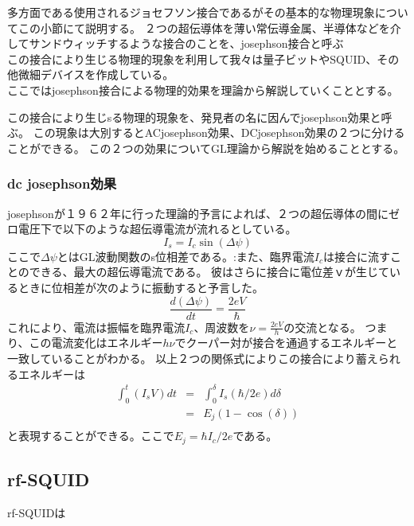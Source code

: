             多方面である使用されるジョセフソン接合であるがその基本的な物理現象についてこの小節にて説明する。
            ２つの超伝導体を薄い常伝導金属、半導体などを介してサンドウィッチするような接合のことを、josephson接合と呼ぶ\\
            この接合により生じる物理的現象を利用して我々は量子ビットやSQUID、その他微細デバイスを作成している。\\
            ここではjosephson接合による物理的効果を理論から解説していくこととする。

    
            この接合により生じsる物理的現象を、発見者の名に因んでjosephson効果と呼ぶ。
            この現象は大別するとACjosephson効果、DCjosephson効果の２つに分けることができる。
            この２つの効果についてGL理論から解説を始めることとする。
            \subsubsection{dc josephson効果}
                josephsonが１９６２年に行った理論的予言によれば、２つの超伝導体の間にゼロ電圧下で以下のような超伝導電流が流れるとしている。
                \begin{equation*}
                    I_s = I_c \sin(\Delta \psi)
                \end{equation*}
                ここで$\Delta \psi$とはGL波動関数のs位相差である。:また、臨界電流$I_c$は接合に流すことのできる、最大の超伝導電流である。
                彼はさらに接合に電位差ｖが生じているときに位相差が次のように振動すると予言した。
                \begin{equation*}
                    \frac{d(\Delta \psi)}{dt} = \frac{2eV}{\hbar}
                \end{equation*}
                これにより、電流は振幅を臨界電流$I_c$、周波数を$\nu = \frac{2eV}{h}$の交流となる。
                つまり、この電流変化はエネルギー$h\nu$でクーパー対が接合を通過するエネルギーと一致していることがわかる。
                以上２つの関係式によりこの接合により蓄えられるエネルギーは
                \begin{eqnarray}
                    \int_0^{t} (I_s V)dt&=&\int_{0}^{\delta} I_s(\hbar/2e)d\delta\\
                    &=&E_j(1-\cos(\delta))\\
                \end{eqnarray}
                と表現することができる。ここで$E_j=\hbar I_c/2e$である。
    \subsection{rf-SQUID}
                rf-SQUIDは
